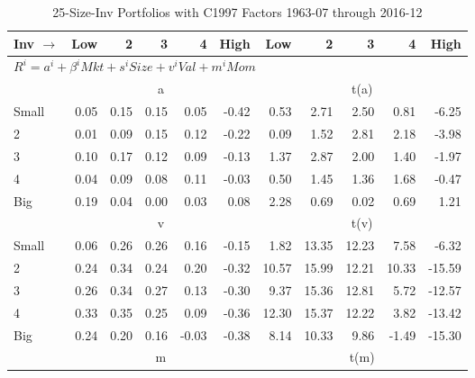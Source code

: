 
\begin{table}[!ht]
\centering
\caption{25-Size-Inv Portfolios with C1997 Factors 1963-07 through 2016-12}
\begin{tabular}{lrrrrrrrrrr}
  \toprule
    Inv $\rightarrow$ & Low & 2 & 3 & 4 & High & Low & 2 & 3 & 4 & High \\ 
  \midrule
  \multicolumn{11}{l}{$R^i=a^i+\beta^iMkt+s^iSize+v^iVal+m^iMom$} \\

  
    
      & \multicolumn{5}{c}{a} & \multicolumn{5}{c}{t(a)}
    
    \\
      \cmidrule(r){2-6} \cmidrule(r){7-11}

    Small   & 0.05  & 0.15  & 0.15  & 0.05  & -0.42  & 0.53  & 2.71  & 2.50  & 0.81  & -6.25  \\
         2  & 0.01  & 0.09  & 0.15  & 0.12  & -0.22  & 0.09  & 1.52  & 2.81  & 2.18  & -3.98  \\
         3  & 0.10  & 0.17  & 0.12  & 0.09  & -0.13  & 1.37  & 2.87  & 2.00  & 1.40  & -1.97  \\
         4  & 0.04  & 0.09  & 0.08  & 0.11  & -0.03  & 0.50  & 1.45  & 1.36  & 1.68  & -0.47  \\
    Big     & 0.19  & 0.04  & 0.00  & 0.03  & 0.08  & 2.28  & 0.69  & 0.02  & 0.69  & 1.21  \\

  
    
      & \multicolumn{5}{c}{v} & \multicolumn{5}{c}{t(v)}
    
    \\
      \cmidrule(r){2-6} \cmidrule(r){7-11}

    Small   & 0.06  & 0.26  & 0.26  & 0.16  & -0.15  & 1.82  & 13.35  & 12.23  & 7.58  & -6.32  \\
         2  & 0.24  & 0.34  & 0.24  & 0.20  & -0.32  & 10.57  & 15.99  & 12.21  & 10.33  & -15.59  \\
         3  & 0.26  & 0.34  & 0.27  & 0.13  & -0.30  & 9.37  & 15.36  & 12.81  & 5.72  & -12.57  \\
         4  & 0.33  & 0.35  & 0.25  & 0.09  & -0.36  & 12.30  & 15.37  & 12.22  & 3.82  & -13.42  \\
    Big     & 0.24  & 0.20  & 0.16  & -0.03  & -0.38  & 8.14  & 10.33  & 9.86  & -1.49  & -15.30  \\

  
    
      & \multicolumn{5}{c}{m} & \multicolumn{5}{c}{t(m)}
    

\end{tabular}
\end{table}
